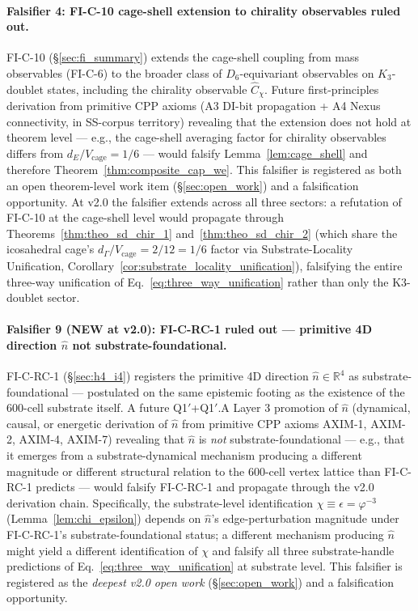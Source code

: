 \documentclass[11pt,letterpaper]{article}
\newcommand{\phig}{\varphi}
\newcommand{\Kthree}{\ensuremath{K_3}}
\newcommand{\Cchi}{\hat{C}_\chi}
\begin{document}
\paragraph{Falsifier 4: FI-C-10 cage-shell extension to chirality observables ruled out.}
FI-C-10 (\S\ref{sec:fi_summary}) extends the cage-shell coupling from mass observables (FI-C-6) to the broader class of $D_6$-equivariant observables on $\Kthree$-doublet states, including the chirality observable $\Cchi$. Future first-principles derivation from primitive CPP axioms (A3 DI-bit propagation + A4 Nexus connectivity, in SS-corpus territory) revealing that the extension does not hold at theorem level --- e.g., the cage-shell averaging factor for chirality observables differs from $d_E/V_\text{cage} = 1/6$ --- would falsify Lemma~\ref{lem:cage_shell} and therefore Theorem~\ref{thm:composite_cap_we}. This falsifier is registered as both an open theorem-level work item (\S\ref{sec:open_work}) and a falsification opportunity. At v2.0 the falsifier extends across all three sectors: a refutation of FI-C-10 at the cage-shell level would propagate through Theorems~\ref{thm:theo_sd_chir_1} and~\ref{thm:theo_sd_chir_2} (which share the icosahedral cage's $d_\Gamma/V_{\text{cage}} = 2/12 = 1/6$ factor via Substrate-Locality Unification, Corollary~\ref{cor:substrate_locality_unification}), falsifying the entire three-way unification of Eq.~\eqref{eq:three_way_unification} rather than only the K3-doublet sector.

\paragraph{Falsifier 9 (NEW at v2.0): FI-C-RC-1 ruled out --- primitive 4D direction $\hat{n}$ not substrate-foundational.}
FI-C-RC-1 (\S\ref{sec:h4_i4}) registers the primitive 4D direction $\hat{n} \in \mathbb{R}^4$ as substrate-foundational --- postulated on the same epistemic footing as the existence of the 600-cell substrate itself. A future Q1$'$+Q1$'$.A Layer 3 promotion of $\hat{n}$ (dynamical, causal, or energetic derivation of $\hat{n}$ from primitive CPP axioms AXIM-1, AXIM-2, AXIM-4, AXIM-7) revealing that $\hat{n}$ is \emph{not} substrate-foundational --- e.g., that it emerges from a substrate-dynamical mechanism producing a different magnitude or different structural relation to the 600-cell vertex lattice than FI-C-RC-1 predicts --- would falsify FI-C-RC-1 and propagate through the v2.0 derivation chain. Specifically, the substrate-level identification $\chi \equiv \epsilon = \phig^{-3}$ (Lemma~\ref{lem:chi_epsilon}) depends on $\hat{n}$'s edge-perturbation magnitude under FI-C-RC-1's substrate-foundational status; a different mechanism producing $\hat{n}$ might yield a different identification of $\chi$ and falsify all three substrate-handle predictions of Eq.~\eqref{eq:three_way_unification} at substrate level. This falsifier is registered as the \emph{deepest v2.0 open work} (\S\ref{sec:open_work}) and a falsification opportunity.
\end{document}
